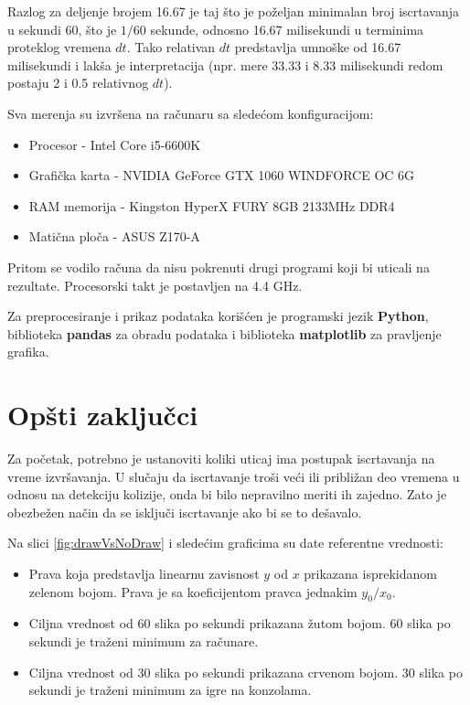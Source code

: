 \documentclass[12pt,oneside]{memoir}
\begin{document}
Razlog za deljenje brojem 16.67 je taj što je poželjan minimalan broj iscrtavanja u sekundi 60, 
što je $1/60$ sekunde, odnosno 16.67 milisekundi u terminima proteklog vremena $dt$.
Tako relativan $dt$ predstavlja umnoške od 16.67 milisekundi i lakša je interpretacija
(npr. mere 33.33 i 8.33 milisekundi redom postaju 2 i 0.5 relativnog $dt$).

Sva merenja su izvršena na računaru sa sledećom konfiguracijom:
\begin{itemize}  
	\item Procesor - Intel Core i5-6600K 
	\item Grafička karta - NVIDIA GeForce GTX 1060 WINDFORCE OC 6G
	\item RAM memorija - Kingston HyperX FURY 8GB 2133MHz DDR4 
	\item Matična ploča - ASUS Z170-A
\end{itemize}  
Pritom se vodilo računa da nisu pokrenuti drugi programi koji bi uticali na rezultate.
Procesorski takt je postavljen na 4.4 GHz.

Za preprocesiranje i prikaz podataka korišćen je programski jezik \textbf{Python},
biblioteka \textbf{pandas} za obradu podataka i biblioteka \textbf{matplotlib}
za pravljenje grafika.

\section{Opšti zaključci}

Za početak, potrebno je ustanoviti koliki uticaj ima postupak iscrtavanja na vreme izvršavanja.
U slučaju da iscrtavanje troši veći ili približan deo vremena u odnosu na detekciju kolizije, onda 
bi bilo nepravilno meriti ih zajedno. Zato je obezbežen način da se isključi iscrtavanje ako bi se to dešavalo.


Na slici \ref{fig:drawVsNoDraw} i sledećim graficima su date referentne vrednosti:
\begin{itemize}  
	\item Prava koja predstavlja linearnu zavisnost $y$ od $x$ prikazana isprekidanom zelenom bojom.
	Prava je sa koeficijentom pravca jednakim $y_0/x_0$.
	\item Ciljna vrednost od 60 slika po sekundi prikazana žutom bojom.
	60 slika po sekundi je traženi minimum za računare.
	\item Ciljna vrednost od 30 slika po sekundi prikazana crvenom bojom.
	30 slika po sekundi je traženi minimum za igre na konzolama.
\end{itemize}  
\end{document}
